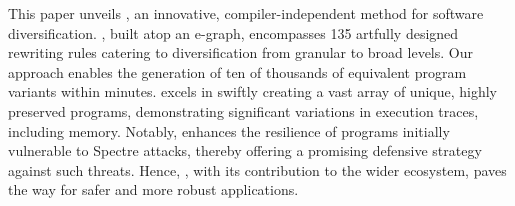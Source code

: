 This paper unveils \tool, an innovative, compiler-independent method for \Wasm software diversification. \tool, built atop an e-graph, encompasses 135 artfully designed rewriting rules catering to diversification from granular to broad levels. 
Our approach enables the generation of ten of thousands of equivalent program variants within minutes. 
\tool excels in swiftly creating a vast array of unique, highly preserved \wasm programs, demonstrating significant variations in execution traces, including memory. 
Notably, \tool enhances the resilience of \wasm programs initially vulnerable to Spectre attacks, thereby offering a promising defensive strategy against such threats. 
Hence, \tool, with its contribution to the wider \wasm ecosystem, paves the way for safer and more robust \wasm applications.